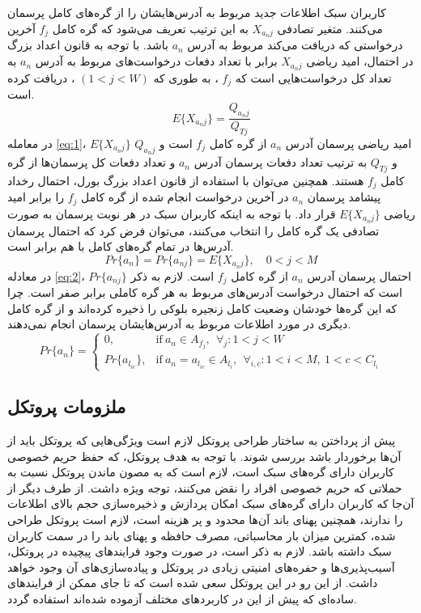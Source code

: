 کاربران سبک اطلاعات جدید مربوط به آدرس‌هایشان را از گره‌های کامل پرسمان می‌کنند. متغیر تصادفی $X_{{a_n}j}$ به این ترتیب تعریف می‌شود که گره کامل $f_j$ آخرین درخواستی که دریافت می‌کند مربوط به آدرس $a_n$ باشد. با توجه به قانون اعداد بزرگ در احتمال، امید ریاضی $X_{{a_n}j}$‌ برابر با تعداد  دفعات درخواست‌های مربوط به آدرس $a_n$ به تعداد کل درخواست‌هایی است که 
$f_j$
، به طوری که
$(1<j<W)$
، دریافت کرده است.
\begin{equation}
E\{X_{{a_n}j}\} = \frac{Q_{{a_n}j}}{Q_{Tj}} \label{eq:1}
\end{equation}
در معامله \eqref{eq:1}،
$E\{X_{{a_n}j}\}$
امید ریاضی پرسمان آدرس $a_n$ از گره کامل
$f_j$ 
است و
$Q_{{a_n}j}$
و
$Q_{Tj}$
به ترتیب تعداد دفعات پرسمان آدرس $a_n$ و تعداد دفعات کل پرسمان‌ها از گره کامل $f_j$ هستند. همچنین می‌توان با استفاده از قانون اعداد بزرگ بورل، احتمال رخداد پیشامد پرسمان $a_n$ در آخرین درخواست انجام شده از گره کامل $f_j$ را برابر امید ریاضی
$E\{X_{{a_n}j}\}$
قرار داد. با توجه به اینکه کاربران سبک در هر نوبت پرسمان به صورت تصادفی یک گره کامل را انتخاب می‌کنند، می‌توان فرض کرد که احتمال پرسمان آدرس‌ها در تمام گره‌های کامل با هم برابر است.
\begin{equation}
Pr\{a_{n}\} = Pr\{a_{nj}\} = E\{X_{{a_n}j}\},\quad 0<j<M \label{eq:2}
\end{equation}
در معادله \eqref{eq:2}، 
$Pr\{a_{nj}\}$
احتمال پرسمان آدرس $a_n$ از گره کامل
$f_j$ 
است. لازم به ذکر است که احتمال درخواست آدرس‌های مربوط به هر گره‌ کاملی برابر صفر است. چرا که این گره‌ها خودشان وضعیت کامل زنجیره بلوکی را ذخیره کرده‌اند و از گره کامل دیگری در مورد اطلاعات مربوط به آدرس‌هایشان پرسمان انجام نمی‌دهند.
\begin{equation}
Pr\{{a_n}\} = 
\begin{cases}
0, & \text{if}\ a_n \in A_{f_j},\ \ \forall_{j} : 1<j<W \\
Pr\{{a_{l_{ic}}}\}, & \text{if}\ a_n = a_{l_{ic}} \in A_{l_i},\ \ \forall_{i,c} : 1<i<M,\  1<c<C_{l_i}
\end{cases} \label{eq:3}
\end{equation} 

\subsection{ملزومات پروتکل}
\label{subsubsection:4.2}
پیش از پرداختن به ساختار طراحی پروتکل لازم است ویژگی‌هایی که پروتکل باید از آن‌ها برخوردار باشد بررسی شوند. با توجه به هدف پروتکل، که حفظ حریم خصوصی کاربران دارای گره‌های سبک است، لازم است که به مصون ماندن پروتکل نسبت به حملاتی که حریم خصوصی افراد را نقض می‌کنند، توجه ویژه داشت. از طرف دیگر از آن‌جا که کاربران دارای گره‌های سبک امکان پردازش‌ و ذخیره‌سازی حجم بالای اطلاعات را ندارند، همچنین پهنای باند آن‌ها محدود و پر هزینه است، لازم است پروتکل طراحی شده، کمترین میزان بار محاسباتی،‌ مصرف حافظه و پهنای باند را در سمت کاربران سبک داشته باشد. لازم به ذکر است، در صورت وجود فرایند‌های پیچیده در پروتکل، آسیب‌پذیری‌ها و حفره‌های امنیتی زیادی در پروتکل و پیاده‌سازی‌های آن وجود خواهد داشت. از این رو در این پروتکل سعی شده است که تا جای ممکن از فرایند‌های ساده‌ای که پیش از این در کاربرد‌های مختلف آزموده شده‌اند استفاده گردد.

